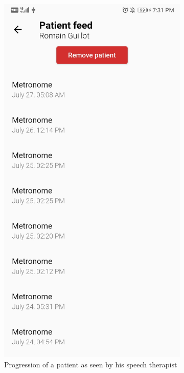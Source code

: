 \begin{appendices}
\begin{landscape}
\begin{figure}[h]
\begin{subfigure}{.25\textwidth}
    \includegraphics[width=.75\linewidth]{content/imgs/screen15.jpg}
    \caption{Progression of a patient as seen by his speech therapist}
  \end{subfigure}%
  \begin{subfigure}{.25\textwidth}
    \centering

\end{subfigure}
\end{figure}
\end{landscape}
\end{appendices}
